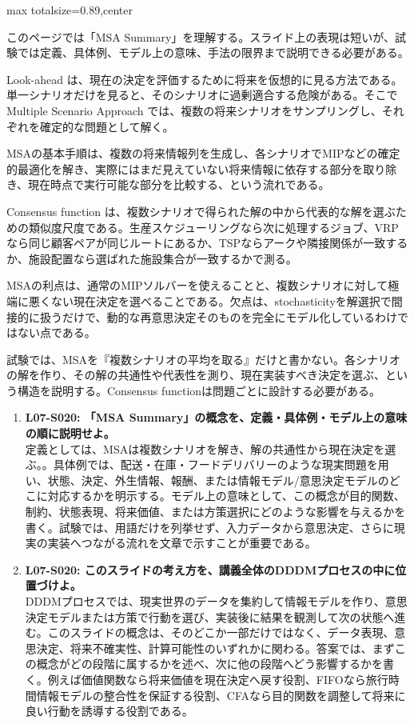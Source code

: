 \begin{minipage}[t]{0.58\textwidth}
\begin{adjustbox}{max totalsize={\textwidth}{0.89\textheight},center}
\begin{minipage}{\textwidth}\scriptsize
{}このページでは「MSA Summary」を理解する。スライド上の表現は短いが、試験では定義、具体例、モデル上の意味、手法の限界まで説明できる必要がある。\par
Look-ahead は、現在の決定を評価するために将来を仮想的に見る方法である。単一シナリオだけを見ると、そのシナリオに過剰適合する危険がある。そこで Multiple Scenario Approach では、複数の将来シナリオをサンプリングし、それぞれを確定的な問題として解く。\par
MSAの基本手順は、複数の将来情報列を生成し、各シナリオでMIPなどの確定的最適化を解き、実際にはまだ見えていない将来情報に依存する部分を取り除き、現在時点で実行可能な部分を比較する、という流れである。\par
Consensus function は、複数シナリオで得られた解の中から代表的な解を選ぶための類似度尺度である。生産スケジューリングなら次に処理するジョブ、VRPなら同じ顧客ペアが同じルートにあるか、TSPならアークや隣接関係が一致するか、施設配置なら選ばれた施設集合が一致するかで測る。\par
MSAの利点は、通常のMIPソルバーを使えることと、複数シナリオに対して極端に悪くない現在決定を選べることである。欠点は、stochasticityを解選択で間接的に扱うだけで、動的な再意思決定そのものを完全にモデル化しているわけではない点である。\par
試験では、MSAを『複数シナリオの平均を取る』だけと書かない。各シナリオの解を作り、その解の共通性や代表性を測り、現在実装すべき決定を選ぶ、という構造を説明する。Consensus functionは問題ごとに設計する必要がある。\par{}\begin{enumerate}\item \textbf{L07-S020: 「MSA Summary」の概念を、定義・具体例・モデル上の意味の順に説明せよ。}\\定義としては、MSAは複数シナリオを解き、解の共通性から現在決定を選ぶ。。具体例では、配送・在庫・フードデリバリーのような現実問題を用い、状態、決定、外生情報、報酬、または情報モデル/意思決定モデルのどこに対応するかを明示する。モデル上の意味として、この概念が目的関数、制約、状態表現、将来価値、または方策選択にどのような影響を与えるかを書く。試験では、用語だけを列挙せず、入力データから意思決定、さらに現実の実装へつながる流れを文章で示すことが重要である。\item \textbf{L07-S020: このスライドの考え方を、講義全体のDDDMプロセスの中に位置づけよ。}\\DDDMプロセスでは、現実世界のデータを集約して情報モデルを作り、意思決定モデルまたは方策で行動を選び、実装後に結果を観測して次の状態へ進む。このスライドの概念は、そのどこか一部だけではなく、データ表現、意思決定、将来不確実性、計算可能性のいずれかに関わる。答案では、まずこの概念がどの段階に属するかを述べ、次に他の段階へどう影響するかを書く。例えば価値関数なら将来価値を現在決定へ戻す役割、FIFOなら旅行時間情報モデルの整合性を保証する役割、CFAなら目的関数を調整して将来に良い行動を誘導する役割である。\end{enumerate}

\end{minipage}
\end{adjustbox}
\end{minipage}
